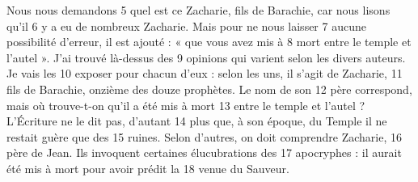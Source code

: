 Nous nous demandons	 
5	 	quel est ce Zacharie, fils de Barachie, car nous lisons qu'il	 
6	 	y a eu de nombreux Zacharie. Mais pour ne nous laisser	 
7	 	aucune possibilité d'erreur, il est ajouté : « que vous avez mis à	 
8	 	mort entre le temple et l'autel ». J'ai trouvé là-dessus des	 
9	 	opinions qui varient selon les divers auteurs. Je vais les	 
10	 	exposer pour chacun d'eux : selon les uns, il s'agit de Zacharie,	 
11	 	fils de Barachie, onzième des douze prophètes. Le nom de son	 
12	 	père correspond, mais où trouve-t-on qu'il a été mis à mort	 
13	 	entre le temple et l'autel ? L'Écriture ne le dit pas, d'autant	 
14	 	plus que, à son époque, du Temple il ne restait guère que des	 
15	 	ruines. Selon d'autres, on doit comprendre Zacharie,	 
16	 	père de Jean. Ils invoquent certaines élucubrations des	 
17	 	apocryphes : il aurait été mis à mort pour avoir prédit la	 
18	 	venue du Sauveur.